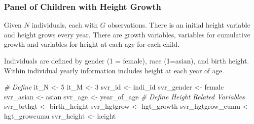 \documentclass[
]{book}
\newenvironment{Shaded}{\begin{snugshade}}{\end{snugshade}}
\newcommand{\CommentTok}[1]{\textcolor[rgb]{0.56,0.35,0.01}{\textit{#1}}}
\newcommand{\DecValTok}[1]{\textcolor[rgb]{0.00,0.00,0.81}{#1}}
\newcommand{\NormalTok}[1]{#1}
\newcommand{\StringTok}[1]{\textcolor[rgb]{0.31,0.60,0.02}{#1}}
\begin{document}
\hypertarget{panel-of-children-with-height-growth}{%
\subsubsection{Panel of Children with Height Growth}\label{panel-of-children-with-height-growth}}

Given \(N\) individuals, each with \(G\) observations. There is an initial height variable and height grows every year. There are growth variables, variables for cumulative growth and variables for height at each age for each child.

Individuals are defined by gender (1 = female), race (1=asian), and birth height. Within individual yearly information includes height at each year of age.

\begin{Shaded}
\begin{Highlighting}[]
\CommentTok{\# Define}
\NormalTok{it\_N \textless{}{-}}\StringTok{ }\DecValTok{5}
\NormalTok{it\_M \textless{}{-}}\StringTok{ }\DecValTok{3}
\NormalTok{svr\_id \textless{}{-}}\StringTok{ \textquotesingle{}indi\_id\textquotesingle{}}
\NormalTok{svr\_gender \textless{}{-}}\StringTok{ \textquotesingle{}female\textquotesingle{}}
\NormalTok{svr\_asian \textless{}{-}}\StringTok{ \textquotesingle{}asian\textquotesingle{}}
\NormalTok{svr\_age \textless{}{-}}\StringTok{ \textquotesingle{}year\_of\_age\textquotesingle{}}
\CommentTok{\# Define Height Related Variables}
\NormalTok{svr\_brthgt \textless{}{-}}\StringTok{ \textquotesingle{}birth\_height\textquotesingle{}}
\NormalTok{svr\_hgtgrow \textless{}{-}}\StringTok{ \textquotesingle{}hgt\_growth\textquotesingle{}}
\NormalTok{svr\_hgtgrow\_cumu \textless{}{-}}\StringTok{ \textquotesingle{}hgt\_growcumu\textquotesingle{}}
\NormalTok{svr\_height \textless{}{-}}\StringTok{ \textquotesingle{}height\textquotesingle{}}


\end{Highlighting}
\end{Shaded}
\end{document}
